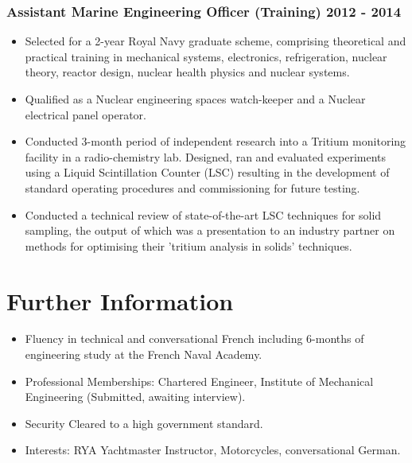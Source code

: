 \documentclass[a4paper, oneside, final, 11pt]{scrartcl} %
\begin{document}
\subsubsection*{Assistant Marine Engineering Officer (Training) \hfill 2012 - 2014}  
\normalfont
\begin{itemize}
	\item Selected for a 2-year Royal Navy graduate scheme, comprising theoretical and practical training in mechanical systems, electronics, refrigeration, nuclear theory, reactor design, nuclear health physics and nuclear systems. 
	\item Qualified as a Nuclear engineering spaces watch-keeper and a Nuclear electrical panel operator. 
	\item Conducted  3-month period of independent research into a Tritium monitoring facility in a radio-chemistry lab. Designed, ran and evaluated experiments using a Liquid Scintillation Counter (LSC) resulting in the development of standard operating procedures and commissioning for future testing. 
	\item Conducted a technical review of state-of-the-art LSC techniques for solid sampling, the output of which was a presentation to an industry partner on methods for optimising their 'tritium analysis in solids' techniques.
\end{itemize}

\smallskip 


\medskip


\section{Further Information}
\begin{itemize}	
\item Fluency in technical and conversational French including 6-months of engineering study at the French Naval Academy. 
\item Professional Memberships: Chartered Engineer, Institute of Mechanical Engineering (Submitted, awaiting interview).
\item Security Cleared to a high government standard.
\item Interests: RYA Yachtmaster Instructor, Motorcycles, conversational German. 
\end{itemize}






\end{document}
